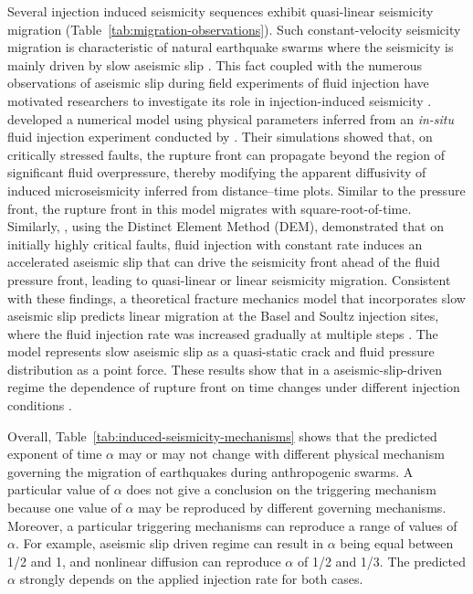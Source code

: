 \documentclass[draft]{agujournal2019}
\begin{document}
Several injection induced seismicity sequences exhibit quasi-linear seismicity migration (Table~\ref{tab:migration-observations}). Such constant-velocity seismicity migration is characteristic of natural earthquake swarms where the seismicity is mainly driven by slow aseismic slip \cite{DeBarrosEtAl2021, DanreEtAl2024}. This fact coupled with the numerous observations of aseismic slip during field experiments of fluid injection have motivated researchers to investigate its role in injection-induced seismicity \cite{GuglielmiEtAl2015b, BhattacharyaViesca2019, DeBarrosEtAl2021}.  developed a numerical model using physical parameters inferred from an \textit{in-situ} fluid injection experiment conducted by . Their simulations showed that, on critically stressed faults, the rupture front can propagate beyond the region of significant fluid overpressure, thereby modifying the apparent diffusivity of induced microseismicity inferred from distance–time plots. Similar to the pressure front, the rupture front in this model migrates with square-root-of-time. Similarly, , using the Distinct Element Method (DEM), demonstrated that on initially highly critical faults, fluid injection with constant rate induces an accelerated aseismic slip that can drive the seismicity front ahead of the fluid pressure front, leading to quasi-linear or linear seismicity migration. Consistent with these findings, a theoretical fracture mechanics model that incorporates slow aseismic slip predicts linear migration at the Basel and Soultz injection sites, where the fluid injection rate was increased gradually at multiple steps \cite{DanreEtAl2024}. The model represents slow aseismic slip as a quasi-static crack and fluid pressure distribution as a point force. These results show that in a aseismic-slip-driven regime the dependence of rupture front on time changes under different injection conditions \cite{SaezUribe2023}.


Overall, Table~\ref{tab:induced-seismicity-mechanisms} shows that the predicted exponent of time $\alpha$ may or may not change with different physical mechanism governing the migration of earthquakes during anthropogenic swarms. A particular value of $\alpha$ does not give a conclusion on the triggering mechanism because one value of $\alpha$ may be reproduced by different governing mechanisms. Moreover, a particular triggering mechanisms can reproduce a range of values of $\alpha$. For example, aseismic slip driven regime can result in $\alpha$ being equal between 1/2 and 1, and nonlinear diffusion can reproduce $\alpha$ of 1/2 and 1/3. The predicted $\alpha$ strongly depends on the applied injection rate for both cases.
\end{document}

